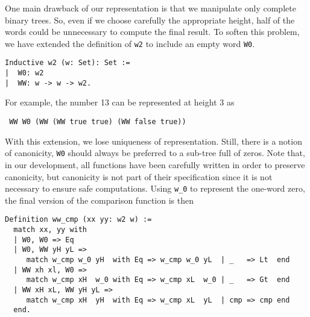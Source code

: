 One main drawback of our representation is that we manipulate only complete 
binary trees. 
So, even if we choose carefully the appropriate height, half of the words 
could be unnecessary to compute the final result. 
To soften this problem, we have extended the definition of {\tt w2} 
to include an empty word {\tt W0}. 
\begin{verbatim}
Inductive w2 (w: Set): Set :=  
|  W0: w2
|  WW: w -> w -> w2.
\end{verbatim}
For example, the number 13 can be represented at height 3 as
\begin{verbatim}
 WW W0 (WW (WW true true) (WW false true))
\end{verbatim}
With this extension, we lose uniqueness of representation. Still, there is a notion
of canonicity, {\tt W0} should always be preferred to a sub-tree full of zeros. Note that, in
our development, all functions have been carefully written in order to preserve canonicity, but
canonicity  is not part of their specification since it is not necessary to ensure safe computations.
Using {\tt w\_0} to represent the one-word zero, 
the final version of the comparison function is then
\begin{verbatim}
Definition ww_cmp (xx yy: w2 w) :=
  match xx, yy with
  | W0, W0 => Eq
  | W0, WW yH yL =>
     match w_cmp w_0 yH  with Eq => w_cmp w_0 yL  | _   => Lt  end
  | WW xh xl, W0 =>
     match w_cmp xH  w_0 with Eq => w_cmp xL  w_0 | _   => Gt  end
  | WW xH xL, WW yH yL =>
     match w_cmp xH  yH  with Eq => w_cmp xL  yL  | cmp => cmp end
  end.
\end{verbatim}



